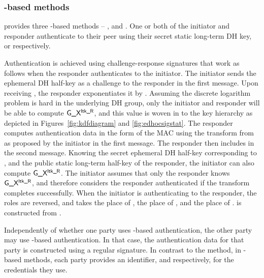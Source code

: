 \subsubsection{\mStat-based methods}
\mEdhoc{} provides three \mStat-based methods -- \mSigStat{}, \mStatStat{} and \mStatSig{}. One or both of the initiator and responder authenticate to their peer using their secret static long-term DH key, \mLtki{} or \mLtkr{} respectively.
%

Authentication is achieved using challenge-response signatures that work as follows when the responder authenticates to the initiator.
%
The initiator sends the ephemeral DH half-key \mGx{} as a challenge to the responder in the first message.
%
%
Upon receiving \mGx{}, the responder exponentiates it by \mLtkr{}.
%
Assuming the discrete logarithm problem is hard in the underlying DH group, only the initiator and responder will be able to compute $\textsf{G\_X}{}^{\textsf{ltk\_R}}{}$, and this value is woven in to the key hierarchy as depicted in Figures~\ref{fig:kdfdiagram} and \ref{fig:edhocsigstat}.
%
The responder computes authentication data \mAuthr{} in the form of the MAC \mMactwo{} using the \mAead{} transform from \mSuites{} as proposed by the initiator in the first message.
%
The responder then includes \mMactwo{} in the second message.
%
Knowing the secret ephemeral DH half-key corresponding to \mGx{}, and the public static long-term half-key of the responder, the initiator can also compute $\textsf{G\_X}{}^{\textsf{ltk\_R}}{}$.
%
The initiator assumes that only the responder knows $\textsf{G\_X}{}^{\textsf{ltk\_R}}{}$, and therefore considers the responder authenticated if the \mAead{} transform completes successfully.
%
When the initiator is authenticating to the responder, the roles are reversed, and \mGy{} takes the place of \mGx{}, \mLtki{} the place of \mLtkr{}, and \mAuthi{} the place of \mAuthr{}. \mAuthi{} is constructed from \mMacthree{}.
%

Independently of whether one party uses \mStat{}-based authentication, the other party may use \mSig{}-based authentication. In that case, the authentication data for that party is constructed using a regular signature.
%
In contrast to the \mPskPsk{} method, in \mStat{}-based methods, each party provides an identifier, \mIdcredi{} and \mIdcredr{} respectively, for the credentials they use.
%
%

\spacehack
